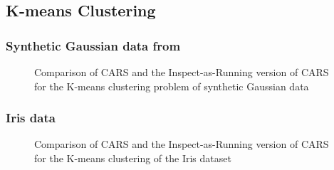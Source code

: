 \documentclass[sn-mathphys,Numbered]{sn-jnl}
\theoremstyle{thmstyleone}
\theoremstyle{thmstyletwo}
\theoremstyle{thmstylethree}
\begin{document}
\subsection{K-means Clustering}
\subsubsection{Synthetic Gaussian data from \cite{yin2018stochastic}}

\begin{figure}
    \centering
    \caption{Comparison of CARS and the Inspect-as-Running version of CARS for the K-means clustering problem of synthetic Gaussian data}
    \label{fig: K-means synthetic}
\end{figure}

\subsubsection{Iris data}
\begin{figure}
    \centering
    \caption{Comparison of CARS and the Inspect-as-Running version of CARS for the K-means clustering of the Iris dataset}
    \label{fig: K-means Iris}
\end{figure}
\end{document}
